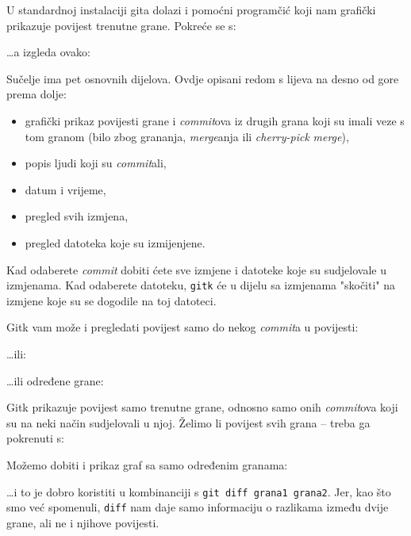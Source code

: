 U standardnoj instalaciji gita dolazi i pomoćni programčić koji nam grafički prikazuje povijest trenutne grane.
Pokreće se s:


\dots{}a izgleda ovako:


Sučelje ima pet osnovnih dijelova.
Ovdje opisani redom s lijeva na desno od gore prema dolje:

\begin{itemize}
	\item grafički prikaz povijesti grane i \emph{commit}ova iz drugih grana koji su imali veze s tom granom (bilo zbog grananja, \emph{merge}anja ili \emph{cherry-pick} \emph{merge}),
	\item popis ljudi koji su \emph{commit}ali,
	\item datum i vrijeme, 
	\item pregled svih izmjena,
	\item pregled datoteka koje su izmijenjene.
\end{itemize}

Kad odaberete \emph{commit} dobiti ćete sve izmjene i datoteke koje su sudjelovale u izmjenama.
Kad odaberete datoteku, \verb+gitk+ će u dijelu sa izmjenama "skočiti" na izmjene koje su se dogodile na toj datoteci.

Gitk vam može i pregledati povijest samo do nekog \emph{commit}a u povijesti:


\dots{}ili:


\dots{}ili određene grane:


Gitk prikazuje povijest samo trenutne grane, odnosno samo onih \emph{commit}ova koji su na neki način sudjelovali u njoj.
Želimo li povijest svih grana -- treba ga pokrenuti s:


Možemo dobiti i prikaz graf sa samo određenim granama:


\dots{}i to je dobro koristiti u kombinanciji s \verb+git diff grana1 grana2+.
Jer, kao što smo već spomenuli, \verb+diff+ nam daje samo informaciju o razlikama između dvije grane, ali ne i njihove povijesti.

